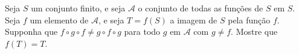 Seja $S$ um conjunto finito, e seja $\mathcal{A}$ o conjunto de todas as funções de $S$ em $S$.
Seja $f$ um elemento de $\mathcal{A}$, e seja $T=f(S)$ a imagem de $S$ pela função $f$.
Supponha que $f\circ g\circ f\ne g\circ f\circ g$ para todo $g$ em $\mathcal{A}$ com $g\ne f$.
Mostre que $f(T)=T$.
